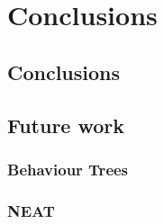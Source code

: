\chapter{Conclusions}

\section{Conclusions}

\section{Future work}

\subsection{Behaviour Trees}

\subsection{NEAT}
